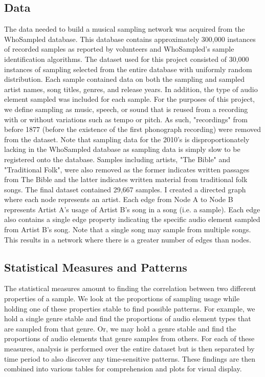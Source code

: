 \documentclass[pageno]{jpaper}
\begin{document}
\subsection{Data}
The data needed to build a musical sampling network was acquired from the WhoSampled database. \cite{WhoSampled} This database contains approximately 300,000 instances of recorded samples as reported by volunteers and WhoSampled's sample identification algorithms. The dataset used for this project consisted of 30,000 instances of sampling selected from the entire database with uniformly random distribution. Each sample contained data on both the sampling and sampled artist names, song titles, genres, and release years. In addition, the type of audio element sampled was included for each sample. For the purposes of this project, we define sampling as music, speech, or sound that is reused from a recording with or without variations such as tempo or pitch. As such, "recordings" from before 1877 (before the existence of the first phonograph recording) were removed from the dataset. Note that sampling data for the 2010's is disproportionately lacking in the WhoSampled database as sampling data is simply slow to be registered onto the database. Samples including artists, "The Bible" and "Traditional Folk", were also removed as the former indicates written passages from The Bible and the latter indicates written material from traditional folk songs. The final dataset contained 29,667 samples. I created a directed graph where each node represents an artist. Each edge from Node A to Node B represents Artist A's usage of Artist B's song in a song (i.e. a sample). Each edge also contains a single edge property indicating the specific audio element sampled from Artist B's song. Note that a single song may sample from multiple songs. This results in a network where there is a greater number of edges than nodes.
\subsection{Statistical Measures and Patterns}
The statistical measures amount to finding the correlation between two different properties of a sample. We look at the proportions of sampling usage while holding one of these properties stable to find possible patterns. For example, we hold a single genre stable and find the proportions of audio element types that are sampled from that genre. Or, we may hold a genre stable and find the proportions of audio elements that genre samples from others. For each of these measures, analysis is performed over the entire dataset but is then separated by time period to also discover any time-sensitive patterns. These findings are then combined into various tables for comprehension and plots for visual display. 
\end{document}
